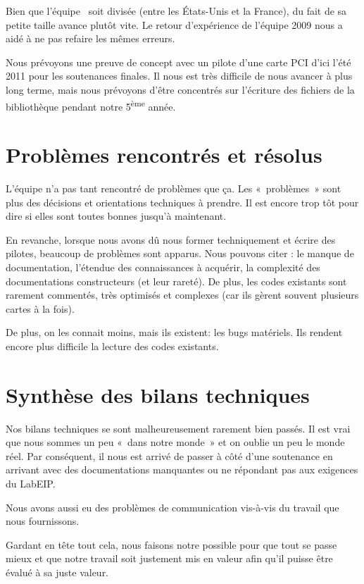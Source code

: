 \documentclass[francais]{rtxreport}
\begin{document}
Bien que l'équipe \rtx\ soit divisée (entre les États-Unis et la France), du
fait de sa petite taille avance plutôt vite. Le retour d'expérience de l'équipe
2009 nous a aidé à ne pas refaire les mêmes erreurs.

Nous prévoyons une preuve de concept avec un pilote d’une carte PCI d’ici l'été
2011 pour les soutenances finales. Il nous est très difficile de nous avancer à
plus long terme, mais nous prévoyons d’être concentrés sur l’écriture des
fichiers de la bibliothèque pendant notre 5\textsuperscript{ème} année.

\section{Problèmes rencontrés et résolus}

L’équipe n’a pas tant rencontré de problèmes que ça. Les «~problèmes~» sont plus
des décisions et orientations techniques à prendre. Il est encore trop tôt pour
dire si elles sont toutes bonnes jusqu’à maintenant.

En revanche, lorsque nous avons dû nous former techniquement et écrire des
pilotes, beaucoup de problèmes sont apparus. Nous pouvons citer : le manque de
documentation, l’étendue des connaissances à acquérir, la complexité des
documentations constructeurs (et leur rareté). De plus, les codes existants sont
rarement commentés, très optimisés et complexes (car ils gèrent souvent
plusieurs cartes à la fois).

De plus, on les connait moins, mais ils existent: les bugs matériels. Ils
rendent encore plus difficile la lecture des codes existants.

\section{Synthèse des bilans techniques}

Nos bilans techniques se sont malheureusement rarement bien passés. Il est vrai
que nous sommes un peu «~dans notre monde~» et on oublie un peu le monde réel.
Par conséquent, il nous est arrivé de passer à côté d’une soutenance en arrivant
avec des documentations manquantes ou ne répondant pas aux exigences du LabEIP.

Nous avons aussi eu des problèmes de communication vis-à-vis du travail que nous
fournissons.

Gardant en tête tout cela, nous faisons notre possible pour que tout se passe
mieux et que notre travail soit justement mis en valeur afin qu’il puisse être
évalué à sa juste valeur.
\end{document}
